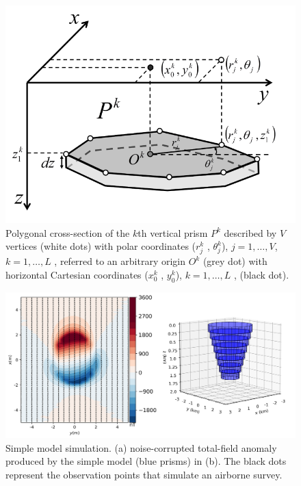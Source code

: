 \begin{figure}
    \centering
    \includegraphics[scale=0.3]{figures/prism_parameters_mod.png}
    \caption{Polygonal cross-section of the $k$th vertical prism $P^k$ described by $V$ vertices (white dots) with polar coordinates ($r^k_j$ , $\theta ^k_j$), $j = 1, \dots, V$, $k = 1, \dots, L$ , referred to an arbitrary origin $O^k$ (grey dot) with horizontal Cartesian coordinates ($x_0^k$ , $y_0^k$), $k = 1, \dots, L$ , (black dot).}
    \label{fig:prism_parameters}
\end{figure}

\begin{figure}
    \centering
    \includegraphics[scale=.5]{figures/wedding_cake_model_data.png}
    \caption{Simple model simulation. (a) noise-corrupted total-field anomaly produced by the simple model (blue prisms) in (b). The black dots represent the observation points that simulate an airborne survey.
}
    \label{fig:kimb_model}
\end{figure}

